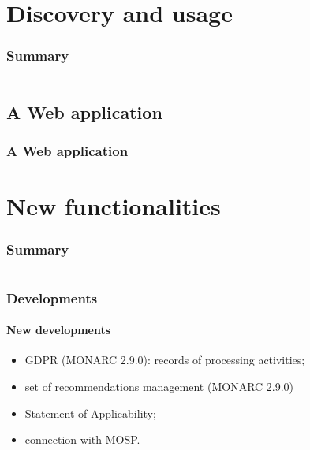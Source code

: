 %
%
\section{Discovery and usage}
\begin{frame}
    \frametitle{Summary}
    \begin{columns}[t]
        \begin{column}{5cm}
            \tableofcontents[sections={1-3}, currentsection, hideothersubsections]
        \end{column}
        \begin{column}{5cm}
            \tableofcontents[sections={4-5}, currentsection, hideothersubsections]
        \end{column}
    \end{columns}
\end{frame}
\subsection{A Web application}
\begin{frame}
    \frametitle{A Web application}
    \framesubtitle{}
\end{frame}




%
%
\section{New functionalities}
\begin{frame}
    \frametitle{Summary}
    \begin{columns}[t]
        \begin{column}{5cm}
            \tableofcontents[sections={1-3}, currentsection, hideothersubsections]
        \end{column}
        \begin{column}{5cm}
            \tableofcontents[sections={4-5}, currentsection, hideothersubsections]
        \end{column}
    \end{columns}
\end{frame}

\begin{frame}
    \frametitle{Developments}
    \framesubtitle{New developments}
    \begin{itemize}
        \item GDPR (MONARC 2.9.0): records of processing activities;
        \item set of recommendations management (MONARC 2.9.0)
        \item Statement of Applicability;
        \item connection with MOSP.
    \end{itemize}
\end{frame}

%         
